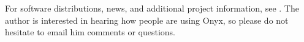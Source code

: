 \documentclass[10pt,titlepage]{book}
\newcommand{\clearemptydoublepage}
	{\newpage \thispagestyle{empty} \cleardoublepage}
\begin{document}
For software distributions, news, and additional project information, see
.  The author is interested in hearing
how people are using Onyx, so please do not hesitate to email him comments or
questions.

\clearemptydoublepage
\tableofcontents
\begin{latexonly}
\listoftables
\end{latexonly}

%
%
\mainmatter

%
%
\renewcommand{\chaptermark}[1]{\markboth{#1}{}}
\renewcommand{\sectionmark}[1]{\markright{\thesection\ #1}}
\lhead[\bfseries\thepage]{\bfseries\rightmark}
\cfoot{}
\setlength{\headrulewidth}{2pt}
\pagestyle{fancy}
\end{document}
